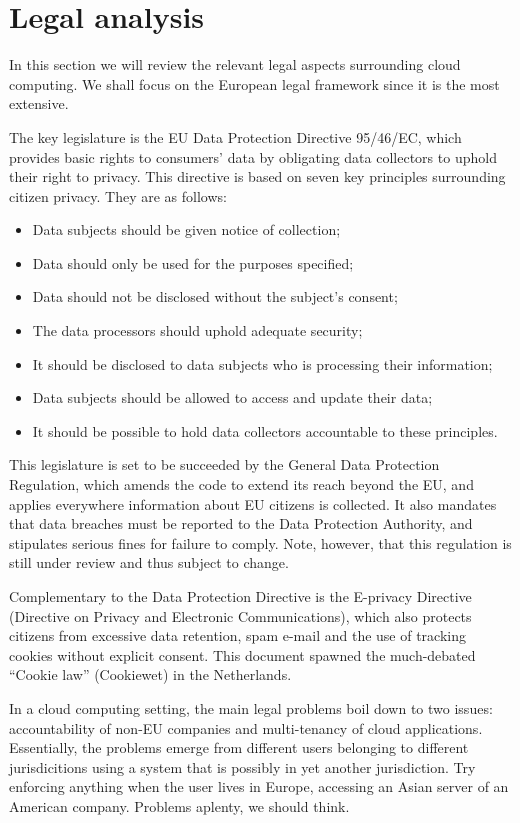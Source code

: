 \documentclass[12pt]{article}
\begin{document}
\section{Legal analysis}
\label{sec:legal_analysis}

In this section we will review the relevant legal aspects surrounding cloud computing. We shall focus on the European legal framework since it is the most extensive.

The key legislature is the EU Data Protection Directive 95/46/EC, which provides basic rights to consumers' data by obligating data collectors to uphold their right to privacy. \cite{directive199595}
This directive is based on seven key principles surrounding citizen privacy.
They are as follows:
\begin{itemize}
\item Data subjects should be given notice of collection;
\item Data should only be used for the purposes specified;
\item Data should not be disclosed without the subject's consent;
\item The data processors should uphold adequate security;
\item It should be disclosed to data subjects who is processing their information;
\item Data subjects should be allowed to access and update their data;
\item It should be possible to hold data collectors accountable to these principles.
\end{itemize}

This legislature is set to be succeeded by the General Data Protection Regulation, which amends the code to extend its reach beyond the EU, and applies everywhere information about EU citizens is collected.
It also mandates that data breaches must be reported to the Data Protection Authority, and stipulates serious fines for failure to comply.
Note, however, that this regulation is still under review and thus subject to change.

Complementary to the Data Protection Directive is the E-privacy Directive (Directive on Privacy and Electronic Communications), which also protects citizens from excessive data retention, spam e-mail and the use of tracking cookies without explicit consent.
This document spawned the much-debated ``Cookie law'' (Cookiewet) in the Netherlands.

In a cloud computing setting, the main legal problems boil down to two issues: accountability of non-EU companies and multi-tenancy of cloud applications. Essentially, the problems emerge from different users belonging to different jurisdicitions using a system that is possibly in yet another jurisdiction. Try enforcing anything when the user lives in Europe, accessing an Asian server of an American company. Problems aplenty, we should think.
\end{document}
